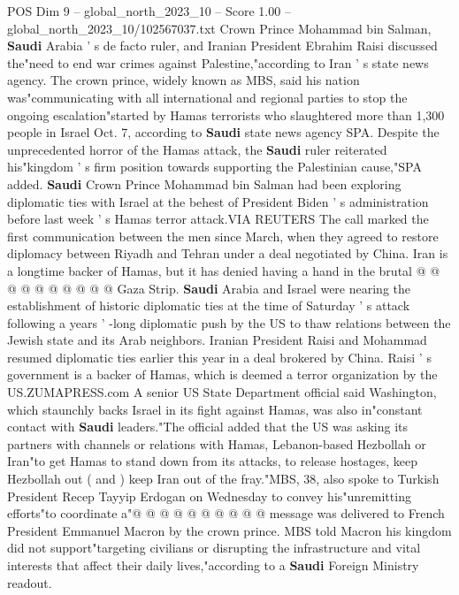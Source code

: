 \begin{textsample}{POS Dim 9 – global\_north\_2023\_10 – Score 1.00 – global\_north\_2023\_10/102567037.txt}  \label{ex:f9_pos_413}
Crown Prince Mohammad bin Salman, \textbf{Saudi} Arabia ' s de facto ruler, and Iranian President Ebrahim Raisi discussed the"need to end war crimes against Palestine,"according to Iran ' s state news agency.
The crown prince, widely known as MBS, said his nation was"communicating with all international and regional parties to stop the ongoing escalation"started by Hamas terrorists who slaughtered more than 1,300 people in Israel Oct. 7, according to \textbf{Saudi} state news agency SPA.
Despite the unprecedented horror of the Hamas attack, the \textbf{Saudi} ruler reiterated his"kingdom ' s firm position towards supporting the Palestinian cause,"SPA added. \textbf{Saudi} Crown Prince Mohammad bin Salman had been exploring diplomatic ties with Israel at the behest of President Biden ' s administration before last week ' s Hamas terror attack.VIA REUTERS The call marked the first communication between the men since March, when they agreed to restore diplomacy between Riyadh and Tehran under a deal negotiated by China.
Iran is a longtime backer of Hamas, but it has denied having a hand in the brutal @ @ @ @ @ @ @ @ @ @ Gaza Strip. \textbf{Saudi} Arabia and Israel were nearing the establishment of historic diplomatic ties at the time of Saturday ' s attack following a years ' -long diplomatic push by the US to thaw relations between the Jewish state and its Arab neighbors.
Iranian President Raisi and Mohammad resumed diplomatic ties earlier this year in a deal brokered by China.
Raisi ' s government is a backer of Hamas, which is deemed a terror organization by the US.ZUMAPRESS.com A senior US State Department official said Washington, which staunchly backs Israel in its fight against Hamas, was also in"constant contact with \textbf{Saudi} leaders."The official added that the US was asking its partners with channels or relations with Hamas, Lebanon-based Hezbollah or Iran"to get Hamas to stand down from its attacks, to release hostages, keep Hezbollah out ( and ) keep Iran out of the fray."MBS, 38, also spoke to Turkish President Recep Tayyip Erdogan on Wednesday to convey his"unremitting efforts"to coordinate a"@ @ @ @ @ @ @ @ @ @ message was delivered to French President Emmanuel Macron by the crown prince.
MBS told Macron his kingdom did not support"targeting civilians or disrupting the infrastructure and vital interests that affect their daily lives,"according to a \textbf{Saudi} Foreign Ministry readout.

\end{textsample}
